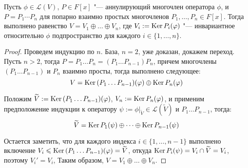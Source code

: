 \begin{corollary}
	Пусть $\phi \in \mathcal{L}(V)$, $P \in F[x]$ "--- аннулирующий многочлен оператора $\phi$, и ${P = P_1 \dotsm P_n}$ для попарно взаимно простых многочленов $P_1, \dotsc, P_n \in F[x]$. Тогда выполнено равенство $V = V_1 \oplus \dots \oplus V_n$, где $V_i := \operatorname{Ker}{P_i(\varphi)}$ "--- инвариантное относительно $\phi$ подпространство для каждого $i \in \{1, \dotsc, n\}$.
\end{corollary}

\begin{proof}
	Проведем индукцию по $n$. База, $n = 2$, уже доказан, докажем переход. Пусть $n > 2$, тогда $P = P_1\dots P_n = (P_1\dots P_{n - 1})P_n$, причем многочлены $(P_1\dots P_{n-1})$ и $P_n$ взаимно просты, тогда выполнено следующее:
	\[V = \operatorname{Ker}{(P_1\dots P_{n-1})(\varphi)} \oplus \operatorname{Ker}{P_n(\varphi)}\]
	
	Положим $\widetilde{V} := \operatorname{Ker}{(P_1\dots P_{n-1})(\varphi)}$, $V_n := \operatorname{Ker}{P_n(\varphi)}$, и применим предположение индукции к оператору $\psi := \phi|_{\widetilde{V}} \in \mathcal L(\widetilde V)$ и $P_1\dots P_{n-1}$, тогда:
	\[\widetilde{V} = \operatorname{Ker}{P_1(\psi)} \oplus \dots \oplus \operatorname{Ker}{P_{n-1}(\psi)}\]
	
	Остается заметить, что для каждого индекса $i \in \{1, \dotsc, n - 1\}$ выполнено включение $V_i \hm{\le} \ke{(P_1\dots P_{n-1})(\phi)} \hm{=} \widetilde{V}$, откуда $\operatorname{Ker}{P_i(\psi)} = V_i \cap \widetilde{V} = V_i$, поэтому $V_i' = V_i$, Таким образом, $V = V_1 \oplus \dots \oplus V_n$.
\end{proof}